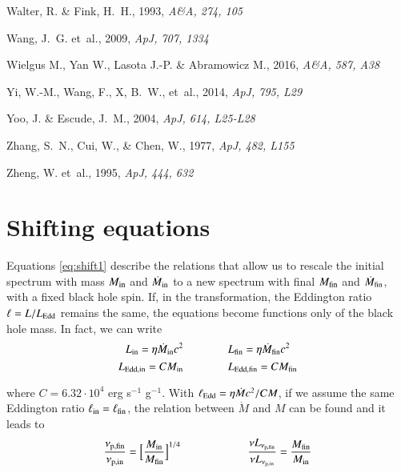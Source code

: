 \documentclass{aa}
\begin{document}
\begin{thebibliography}{}
Walter, R. \& Fink, H.~H., 1993,
\newblock \emph{A\&A, 274, 105}

Wang, J.~G. et~al., 2009,
\newblock \emph{ApJ, 707, 1334}

 Wielgus M., Yan W., Lasota J.-P. \& Abramowicz M., 2016,
\newblock \emph{A\&A, 587, A38}

Yi, W.-M., Wang, F., X, B.~W., et~al., 2014,
\newblock \emph{ApJ, 795, L29}

Yoo, J. \& Escude, J.~M., 2004,
\newblock \emph{ApJ, 614, L25-L28}

Zhang, S.~N., Cui, W., \& Chen, W., 1977,
\newblock \emph{ApJ, 482, L155}

Zheng, W. et~al., 1995,
\newblock \emph{ApJ, 444, 632}
\end{thebibliography}

\begingroup
\let\clearpage\relax










\appendix

\section{Shifting equations}

Equations \eqref{eq:shift1} describe the relations that allow us to rescale the initial spectrum with mass $M_{\rm in}$ and $\dot{M}_{\rm in}$ to a new spectrum with final $M_{\rm fin}$ and $\dot{M}_{\rm fin}$, with a fixed black hole spin. If, in the transformation, the Eddington ratio $\ell = L / L_{\rm Edd}$ remains the same, the equations become functions only of the black hole mass. In fact, we can write
	\[
		L_{\rm in} = \eta \dot{M}_{\rm in} c^2 \qquad \qquad L_{\rm fin} = \eta \dot{M}_{\rm fin} c^2
	\]
	\[
		L_{\rm Edd, in} = C M_{\rm in} \qquad \qquad L_{\rm Edd, fin} = C M_{\rm fin}
	\]

\noindent where $C = 6.32 \cdot 10^4$ erg s$^{-1}$ g$^{-1}$. With $\ell_{\rm Edd} = \eta \dot{M} c^2 / CM$, if we assume the same Eddington ratio $\ell_{\rm in} = \ell_{\rm fin}$, the relation between $\dot{M}$ and $M$ can be found and it leads to
	\begin{equation} \label{eq:shift1apnew}
		\frac{\nu_{\rm p, fin}}{\nu_{\rm p, in}} = \Bigl[ \frac{M_{\rm in}}{M_{\rm fin}} \Bigl]^{1/4} \qquad \qquad \qquad
		\frac{\nu L_{\nu_{\rm p, fin}}}{\nu L_{\nu_{\rm p, in}}} = \frac{M_{\rm fin}}{M_{\rm in}}
	\end{equation}
\end{document}
